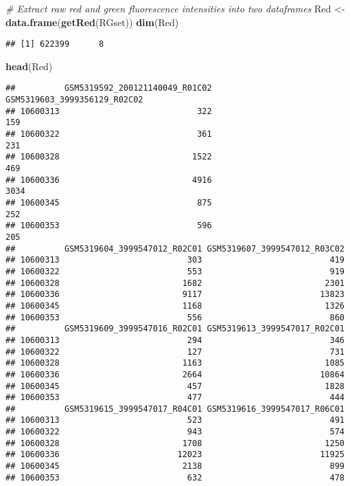 \documentclass[
]{article}
\newenvironment{Shaded}{\begin{snugshade}}{\end{snugshade}}
\newcommand{\CommentTok}[1]{\textcolor[rgb]{0.56,0.35,0.01}{\textit{#1}}}
\newcommand{\FunctionTok}[1]{\textcolor[rgb]{0.13,0.29,0.53}{\textbf{#1}}}
\newcommand{\NormalTok}[1]{#1}
\newcommand{\OtherTok}[1]{\textcolor[rgb]{0.56,0.35,0.01}{#1}}
\begin{document}
\begin{Shaded}
\begin{Highlighting}[]
\CommentTok{\# Extract raw red and green fluorescence intensities into two dataframes}
\NormalTok{Red }\OtherTok{\textless{}{-}} \FunctionTok{data.frame}\NormalTok{(}\FunctionTok{getRed}\NormalTok{(RGset))}
\FunctionTok{dim}\NormalTok{(Red)}
\end{Highlighting}
\end{Shaded}

\begin{verbatim}
## [1] 622399      8
\end{verbatim}

\begin{Shaded}
\begin{Highlighting}[]
\FunctionTok{head}\NormalTok{(Red)}
\end{Highlighting}
\end{Shaded}

\begin{verbatim}
##          GSM5319592_200121140049_R01C02 GSM5319603_3999356129_R02C02
## 10600313                            322                          159
## 10600322                            361                          231
## 10600328                           1522                          469
## 10600336                           4916                         3034
## 10600345                            875                          252
## 10600353                            596                          205
##          GSM5319604_3999547012_R02C01 GSM5319607_3999547012_R03C02
## 10600313                          303                          419
## 10600322                          553                          919
## 10600328                         1682                         2301
## 10600336                         9117                        13823
## 10600345                         1168                         1326
## 10600353                          556                          860
##          GSM5319609_3999547016_R02C01 GSM5319613_3999547017_R02C01
## 10600313                          294                          346
## 10600322                          127                          731
## 10600328                         1163                         1085
## 10600336                         2664                        10864
## 10600345                          457                         1828
## 10600353                          477                          444
##          GSM5319615_3999547017_R04C01 GSM5319616_3999547017_R06C01
## 10600313                          523                          491
## 10600322                          943                          574
## 10600328                         1708                         1250
## 10600336                        12023                        11925
## 10600345                         2138                          899
## 10600353                          632                          478
\end{verbatim}
\end{document}
